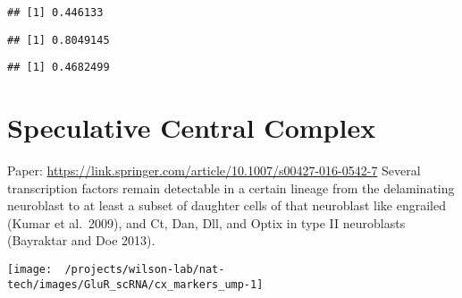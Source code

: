 \documentclass[
]{article}
\begin{document}
\begin{verbatim}
## [1] 0.446133
\end{verbatim}

\begin{verbatim}
## [1] 0.8049145
\end{verbatim}

\begin{verbatim}
## [1] 0.4682499
\end{verbatim}

\hypertarget{speculative-central-complex}{%
\section{Speculative Central
Complex}\label{speculative-central-complex}}

Paper: \url{https://link.springer.com/article/10.1007/s00427-016-0542-7}
Several transcription factors remain detectable in a certain lineage
from the delaminating neuroblast to at least a subset of daughter cells
of that neuroblast like engrailed (Kumar et al.~2009), and Ct, Dan, Dll,
and Optix in type II neuroblasts (Bayraktar and Doe 2013).

\begin{center}\texttt{[image: ~/projects/wilson-lab/nat-tech/images/GluR\_scRNA/cx\_markers\_ump-1]} \end{center}
\end{document}
